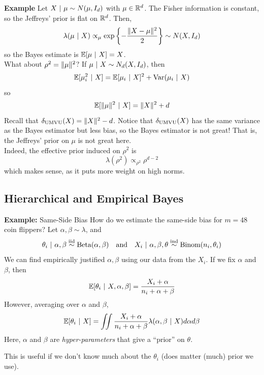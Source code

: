 \begin{example}{\textbf{Example}}
    Let $X \given \mu \sim N(\mu, I_{d})$ with $\mu \in \R^{d}$. The Fisher information is constant, so the Jeffreys' prior is flat on $\R^{d}$. Then,
    \[ \lambda(\mu \given X) \propto_{\mu} \exp\left\{-\frac{\norm{X - \mu}^2}{2}\right\} \sim N(X, I_{d}) \]
    so the Bayes estimate is $\bb{E}[\mu \given X] = X$.\\

    What about $\rho^2 = \norm{\mu}^2$? If $\mu \given X \sim N_{d}(X, I_{d})$, then
    \[ \bb{E}[\mu_i^2 \given X] = \bb{E}[\mu_i \given X]^2 + \Var(\mu_i \given X) \]
    so
    \[ \bb{E}[\norm{\mu}^2 \given X] = \norm{X}^2 + d \]
    Recall that $\delta_{\tt{UMVU}}(X) = \norm{X}^2 - d$. Notice that $\delta_{\tt{UMVU}}(X)$ has the same variance as the Bayes estimator but less bias, so the Bayes estimator is not great! That is, the Jeffreys' prior on $\mu$ is not great here.\\

    Indeed, the effective prior induced on $\rho^2$ is
    \[ \lambda(\rho^2) \propto_{\rho^2} \rho^{d - 2} \]
    which makes sense, as it puts more weight on high norms.
\end{example}

\subsection*{Hierarchical and Empirical Bayes}
\sectionspace

\begin{example}{\textbf{Example:} Same-Side Bias}
    How do we estimate the same-side bias for $m = 48$ coin flippers? Let $\alpha, \beta \sim \lambda$, and
    \[ \theta_i \given \alpha, \beta \iidsim \tt{Beta}(\alpha, \beta) \quand X_i \given \alpha, \beta, \theta \overset{\tt{ind}}{\sim} \Binom(n_i, \theta_i) \]
    We can find empirically justified $\alpha, \beta$ using our data from the $X_i$. If we fix $\alpha$ and $\beta$, then
    \[ \bb{E}[\theta_i \given X, \alpha, \beta] = \frac{X_i + \alpha}{n_i + \alpha + \beta} \]
    However, averaging over $\alpha$ and $\beta$,
    \[ \bb{E}[\theta_i \given X] = \iint \frac{X_i + \alpha}{n_i + \alpha + \beta}\lambda(\alpha, \beta \given X) d\alpha d\beta \]
    Here, $\alpha$ and $\beta$ are \emph{hyper-parameters} that give a ``prior'' on $\theta$.
\end{example}
This is useful if we don't know much about the $\theta_i$ (does matter (much) prior we use).
